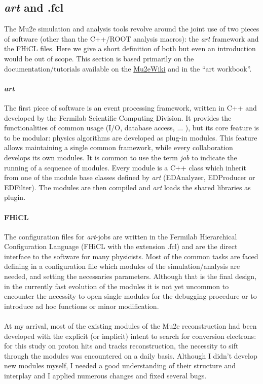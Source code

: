 \documentclass[12pt,a4paper,openright, oneside, titlepage]{book} %
\begin{document}
\subsection{\textit{art} and .fcl}
The Mu2e simulation and analysis tools revolve around the joint use of two pieces of software (other than the C++/ROOT analysis macros): the \textit{art} framework and the FHiCL files. Here we give a short definition of both but even an introduction would be out of scope. This section is based primarily on the documentation/tutorials available on the  \href{https://mu2ewiki.fnal.gov/}{Mu2eWiki} and in the ``art workbook''\cite{art}.

\paragraph{\textit{art}} The first piece of software is an event processing framework, written in C++ and developed by the Fermilab Scientific Computing Division. It provides the functionalities of common usage (I/O, database access, ... ), but its core feature is to be modular: physics algorithms are developed as plug-in modules. 
This feature allows maintaining a single common framework, while every collaboration develops its own modules. 
It is common to use the term \textit{job} to indicate the running of a sequence of modules.   
Every module is a C++ class which inherit from one of the module base classes defined by \textit{art} (EDAnalyzer, EDProducer or EDFilter). The modules are then compiled and \textit{art} loads the shared libraries as plugin.

\paragraph{FHiCL} The configuration files for \textit{art}-jobs are written in the Fermilab Hierarchical Configuration Language (FHiCL with the extension .fcl) and are the direct interface to the software for many physicists. 
Most of the common tasks are faced defining in a configuration file which modules of the simulation/analysis are needed, and setting the necessaries parameters. 
Although that is the final design, in the currently fast evolution of the modules it is not yet uncommon to encounter the necessity to open single modules for the debugging procedure or to introduce ad hoc functions or minor modification.\\ \\
At my arrival, most of the existing modules of the Mu2e reconstruction had been developed with the explicit (or implicit) intent to search for conversion electrons: for this study on proton hits and tracks reconstruction, the necessity to sift through the modules was encountered on a daily basis. 
Although I didn't develop new modules myself, I needed a good understanding of their structure and interplay and I applied numerous changes and fixed several bugs.
\end{document}
